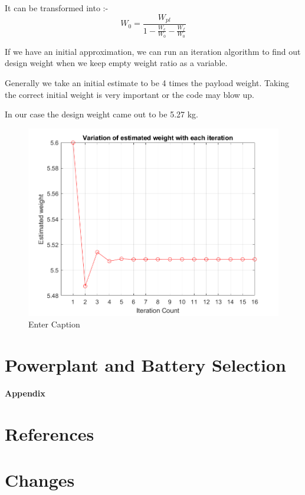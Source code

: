 \documentclass[12 pt]{article}
\begin{document}
It can be transformed into :- 
$$W_{0} = \frac{W_{pl}}{1 - \frac{W_{e}}{W_{0}} - \frac{W_{f}}{W_0}}$$

If we have an initial approximation, we can run an iteration algorithm to find out design weight when we keep empty weight ratio as a variable.

Generally we take an initial estimate to be 4 times the payload weight. Taking the correct initial weight is very important or the code may blow up.

In our case the design weight came out to be 5.27 kg.

\begin{figure}
    \centering
    \includegraphics[width=0.75\linewidth]{Codes/Week 2/weight.png}
    \caption{Enter Caption}
    \label{fig:enter-label}
\end{figure}

\vfill

\newpage

\section{Powerplant and Battery Selection}

\newpage

\textbf{\Huge{Appendix}}
\appendix


\section{References}




\newpage

\section{Changes}
\end{document}
